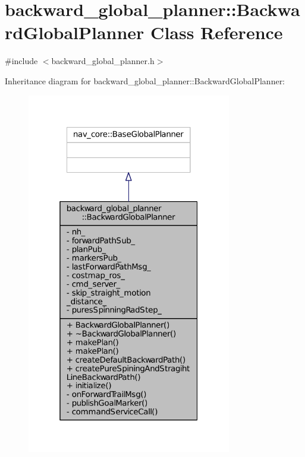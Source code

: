 \hypertarget{classbackward__global__planner_1_1BackwardGlobalPlanner}{}\section{backward\+\_\+global\+\_\+planner\+:\+:Backward\+Global\+Planner Class Reference}
\label{classbackward__global__planner_1_1BackwardGlobalPlanner}


{\ttfamily \#include $<$backward\+\_\+global\+\_\+planner.\+h$>$}



Inheritance diagram for backward\+\_\+global\+\_\+planner\+:\+:Backward\+Global\+Planner\+:
\nopagebreak
\begin{figure}[H]
\begin{center}
\leavevmode
\includegraphics[width=253pt]{classbackward__global__planner_1_1BackwardGlobalPlanner__inherit__graph}
\end{center}
\end{figure}



